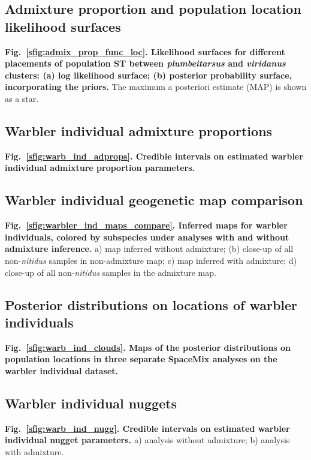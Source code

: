 \documentclass[10pt,letterpaper]{article}
\begin{document}
\subsection*{Admixture proportion and population location likelihood surfaces}
\label{admix_prop_func_loc_lnl}
{\bf{Fig.\ \ref{sfig:admix_prop_func_loc}. Likelihood surfaces for different placements of population ST between \textit{plumbeitarsus} and \textit{viridanus} clusters: (a) log likelihood surface; (b) posterior probability surface, incorporating the priors.}}  The maximum a posteriori estimate (MAP) is shown as a star. 

\subsection*{Warbler individual admixture proportions}
\label{warb_ind_adprops}
{\bf{Fig.\ \ref{sfig:warb_ind_adprops}. Credible intervals on estimated warbler individual admixture proportion parameters.}}

\subsection*{Warbler individual geogenetic map comparison}
\label{warbler_ind_maps_compare}
{\bf{Fig.\ \ref{sfig:warbler_ind_maps_compare}. Inferred maps for warbler individuals, colored by subspecies under analyses with and without admixture inference.}} a) map inferred without admixture; (b) close-up of all non-\textit{nitidus} samples in non-admixture map; c) map inferred with admixture; d) close-up of all non-\textit{nitidus} samples in the admixture map.

\subsection*{Posterior distributions on locations of warbler individuals}
\label{warb_ind_clouds}
{\bf{Fig.\ \ref{sfig:warb_ind_clouds}. Maps of the posterior distributions on population locations in three separate SpaceMix analyses on the warbler individual dataset.}}

\subsection*{Warbler individual nuggets}
\label{warb_ind_nugg}
{\bf{Fig.\ \ref{sfig:warb_ind_nugg}. Credible intervals on estimated warbler individual nugget parameters. }} a) analysis without admixture; b) analysis with admixture.
\end{document}
